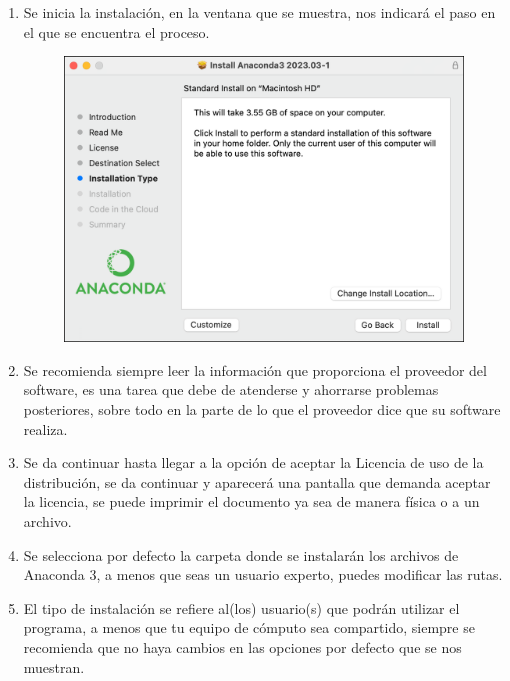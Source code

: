 \documentclass[12pt]{article}
\begin{document}
\begin{enumerate}
\item Se inicia la instalación, en la ventana que se muestra, nos indicará el paso en el que se encuentra el proceso.
\begin{figure}[H]
	\centering
	\includegraphics[scale=0.5]{Imagenes/Nueva_Instalacion__Mac_02.png} 
\end{figure}
\item Se recomienda siempre leer la información que proporciona el proveedor del software, es una tarea que debe de atenderse y ahorrarse problemas posteriores, sobre todo en la parte de lo que el proveedor dice que su software realiza.
\item Se da continuar hasta llegar a la opción de aceptar la Licencia de uso de la distribución, se da continuar y aparecerá una pantalla que demanda aceptar la licencia, se puede imprimir el documento ya sea de manera física o a un archivo.
\item Se selecciona por defecto la carpeta donde se instalarán los archivos de Anaconda 3, a menos que seas un usuario experto, puedes modificar las rutas.
\item El tipo de instalación se refiere al(los) usuario(s) que podrán utilizar el programa, a menos que tu equipo de cómputo sea compartido, siempre se recomienda que no haya cambios en las opciones por defecto que se nos muestran.


\end{enumerate}
\end{document}
